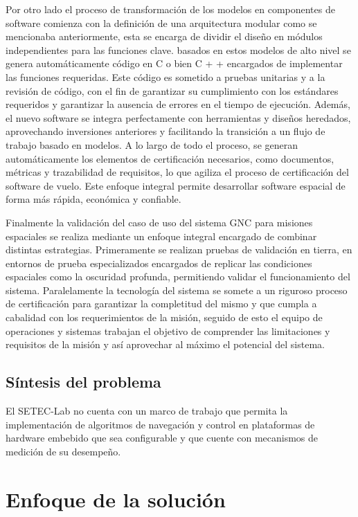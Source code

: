 \documentclass[12pt]{article}
\begin{document}
Por otro lado el proceso de transformación de los modelos en componentes de software comienza con la definición de una arquitectura modular como se mencionaba anteriormente, esta se encarga de dividir el diseño en módulos independientes para las funciones clave. basados en estos modelos de alto nivel se genera automáticamente código en C o bien C + + encargados de implementar las funciones requeridas. Este código es sometido a pruebas unitarias y a la revisión de código, con el fin de garantizar su cumplimiento con los estándares requeridos y garantizar la ausencia de errores en el tiempo de ejecución. Además, el nuevo software se integra perfectamente con herramientas y diseños heredados, aprovechando inversiones anteriores y facilitando la transición a un flujo de trabajo basado en modelos. A lo largo de todo el proceso, se generan automáticamente los elementos de certificación necesarios, como documentos, métricas y trazabilidad de requisitos, lo que agiliza el proceso de certificación del software de vuelo. Este enfoque integral permite desarrollar software espacial de forma más rápida, económica y confiable.

Finalmente la validación del caso de uso del sistema GNC para misiones espaciales se realiza mediante un enfoque integral encargado de combinar distintas estrategias. Primeramente se realizan pruebas de validación en tierra, en entornos de prueba especializados encargados de replicar las condiciones espaciales como la oscuridad profunda, permitiendo validar el funcionamiento del sistema. Paralelamente la tecnología del sistema se somete a un riguroso proceso de certificación para garantizar la completitud del mismo y que cumpla a cabalidad con los requerimientos de la misión, seguido de esto el equipo de operaciones y sistemas trabajan el objetivo de comprender las limitaciones y requisitos de la misión y así aprovechar al máximo el potencial del sistema.

\subsection{Síntesis del problema}

El SETEC-Lab no cuenta con un marco de trabajo que permita la implementación de algoritmos de navegación  y control en plataformas de hardware embebido que sea configurable y que cuente con mecanismos de medición de su desempeño.


\section{Enfoque de la solución}
\end{document}
